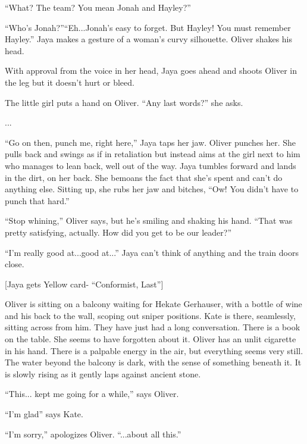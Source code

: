 ``What?  The team?  You mean Jonah and Hayley?''

``Who's Jonah?''``Eh...Jonah's easy to forget.  But Hayley!  You must remember Hayley.''  Jaya makes a gesture of a woman's curvy silhouette.  Oliver shakes his head.



With approval from the voice in her head, Jaya goes ahead and shoots Oliver in the leg but it doesn't hurt or bleed.



The little girl puts a hand on Oliver.  ``Any last words?'' she asks.

...

``Go on then, punch me, right here,'' Jaya taps her jaw.  Oliver punches her.   She pulls back and swings as if in retaliation but instead aims at the girl next to him who manages to lean back, well out of the way.  Jaya tumbles forward and lands in the dirt, on her back.   She bemoans the fact that she's spent and can't do anything else.  Sitting up, she rubs her jaw and bitches, ``Ow!  You didn't have to punch that hard.'' 

``Stop whining,'' Oliver says, but he's smiling and shaking his hand.  ``That was pretty satisfying, actually.  How did you get to be our leader?''

``I'm really good at...good at...'' Jaya can't think of anything and the train doors close.



{[}Jaya gets Yellow card- ``Conformist, Last''{]}




Oliver is sitting on a balcony waiting for Hekate Gerhauser, with a bottle of wine and his back to the wall, scoping out sniper positions. Kate is there, seamlessly, sitting across from him. They have just had a long conversation. There is a book on the table. She seems to have forgotten about it. Oliver has an unlit cigarette in his hand. There is a palpable energy in the air, but everything seems very still.  The water beyond the balcony is dark, with the sense of something beneath it. It is slowly rising as it gently laps against ancient stone.



``This... kept me going for a while,'' says Oliver.

``I'm glad'' says Kate.

``I'm sorry,'' apologizes Oliver.  ``...about all this.''


